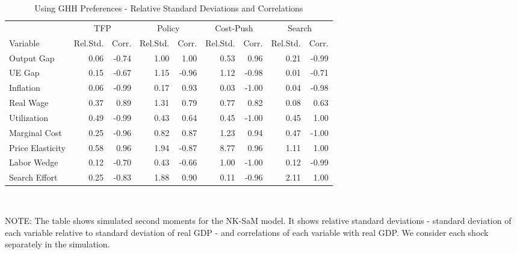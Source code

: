 \documentclass[12pt,3p,authoryear,review]{elsarticle}
\begin{document}
\begin{table}[h!]%
	\begin{center}%
		\begin{footnotesize}%
			\caption{Using GHH Preferences - Relative Standard Deviations and Correlations}\label{tab:app_robust_ghh}%
			\begin{tabular}{l r r r r r r r r}%
				\hline%
				& \multicolumn{2}{c}{TFP} & \multicolumn{2}{c}{Policy} & \multicolumn{2}{c}{Cost-Push} & \multicolumn{2}{c}{Search}\\%
				Variable & Rel.Std. & Corr. & Rel.Std. & Corr. & Rel.Std. & Corr. & Rel.Std. & Corr.\\%
				\hline \hline%
				Output Gap & 0.06 & -0.74 & 1.00 & 1.00 & 0.53 & 0.96 & 0.21 & -0.99\\%
				UE Gap & 0.15 & -0.67 & 1.15 & -0.96 & 1.12 & -0.98 & 0.01 & -0.71\\%
				Inflation & 0.06 & -0.99 & 0.17 & 0.93 & 0.03 & -1.00 & 0.04 & -0.98\\%
				Real Wage & 0.37 & 0.89 & 1.31 & 0.79 & 0.77 & 0.82 & 0.08 & 0.63\\%
				Utilization & 0.49 & -0.99 & 0.43 & 0.64 & 0.45 & -1.00 & 0.45 & 1.00\\%
				Marginal Cost & 0.25 & -0.96 & 0.82 & 0.87 & 1.23 & 0.94 & 0.47 & -1.00\\%
				Price Elasticity & 0.58 & 0.96 & 1.94 & -0.87 & 8.77 & 0.96 & 1.11 & 1.00\\%
				Labor Wedge & 0.12 & -0.70 & 0.43 & -0.66 & 1.00 & -1.00 & 0.12 & -0.99\\%
				Search Effort & 0.25 & -0.83 & 1.88 & 0.90 & 0.11 & -0.96 & 2.11 & 1.00\\%
				\hline%
			\end{tabular}\\%
			\vspace{0.1in}%
			{\tiny NOTE: The table shows simulated second moments for the NK-SaM model. It shows relative standard deviations - standard deviation of each variable relative to standard deviation of real GDP - and correlations of each variable with real GDP. We consider each shock separately in the simulation.\par}%
		\end{footnotesize}%
	\end{center}%
\end{table}%
\end{document}
